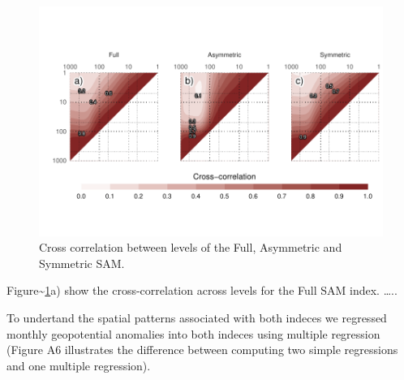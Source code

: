 \documentclass[]{ametsocV5}
\begin{document}
\begin{figure}
\includegraphics{cross-correlation-1} \caption[Cross correlation between levels of the Full, Asymmetric and Symmetric SAM]{Cross correlation between levels of the Full, Asymmetric and Symmetric SAM.}\label{fig:cross-correlation}
\end{figure}

Figure\textasciitilde{}\ref{fig:cross-correlation}a) show the
cross-correlation across levels for the Full SAM index. \ldots{}..

To undertand the spatial patterns associated with both indeces we
regressed monthly geopotential anomalies into both indeces using
multiple regression (Figure A6 illustrates the difference between
computing two simple regressions and one multiple regression).
\end{document}
